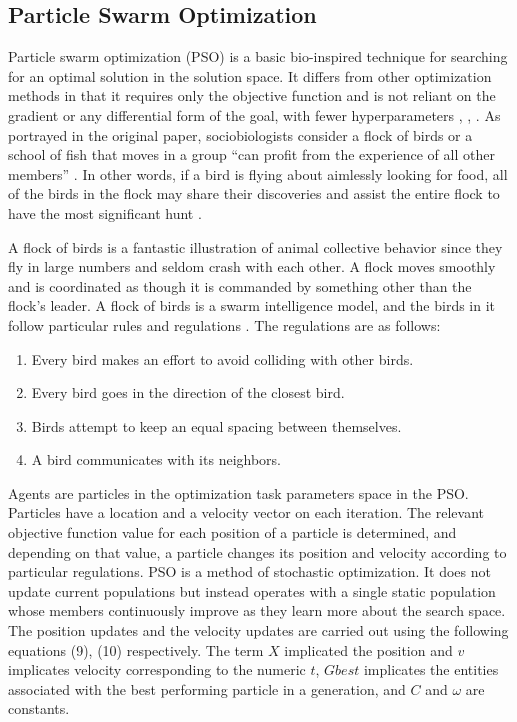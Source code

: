 \documentclass[default,iicol]{sn-jnl}
\theoremstyle{thmstyleone}
\theoremstyle{thmstyletwo}
\theoremstyle{thmstylethree}
\begin{document}
\subsection{Particle Swarm Optimization}\label{subsec8}

Particle swarm optimization (PSO) \cite{bib16} is a basic bio-inspired technique for searching for an optimal solution in the solution space. It differs from other optimization methods in that it requires only the objective function and is not reliant on the gradient or any differential form of the goal, with fewer hyperparameters \cite{bib16}, \cite{bib37}, \cite{bib38}.  As portrayed in the original paper, sociobiologists consider a flock of birds or a school of fish that moves in a group “can profit from the experience of all other members” \cite{bib17}. In other words, if a bird is flying about aimlessly looking for food, all of the birds in the flock may share their discoveries and assist the entire flock to have the most significant hunt \cite{bib39}.


A flock of birds is a fantastic illustration of animal collective behavior since they fly in large numbers and seldom crash with each other. A flock moves smoothly and is coordinated as though it is commanded by something other than the flock's leader. A flock of birds is a swarm intelligence model, and the birds in it follow particular rules and regulations \cite{bib17}.
The regulations are as follows:
\begin{enumerate}[1.]
\item Every bird makes an effort to avoid colliding with other birds.

\item Every bird goes in the direction of the closest bird.

\item Birds attempt to keep an equal spacing between themselves.

\item A bird communicates with its neighbors. 
\end{enumerate}
Agents are particles in the optimization task parameters space in the PSO. Particles have a location and a velocity vector on each iteration. The relevant objective function value for each position of a particle is determined, and depending on that value, a particle changes its position and velocity according to particular regulations. PSO is a method of stochastic optimization. It does not update current populations but instead operates with a single static population whose members continuously improve as they learn more about the search space. The position updates and the velocity updates are carried out using the following equations (9), (10) respectively. The term $X$ implicated the position and $v$ implicates velocity corresponding to the numeric $t$, $Gbest$ implicates the entities associated with the best performing particle in a generation, and $C$ and $\omega$ are constants.
\end{document}
